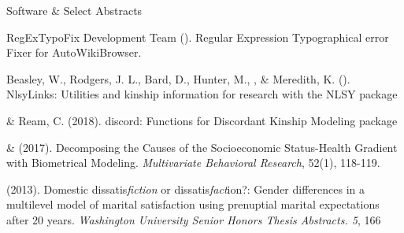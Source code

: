 \begin{rSection}{\textrm{Software \& Select Abstracts}}%
\begin{etaremune}
\item RegExTypoFix Development Team (\the\year). Regular Expression Typographical error Fixer for AutoWikiBrowser. \href{https://en.wikipedia.org/wiki/Wikipedia:AutoWikiBrowser/Typos}{\color{blue}{https://en.wikipedia.org/wiki/Wikipedia:AutoWikiBrowser/Typos}}
\item  Beasley, W., Rodgers, J. L., Bard, D., Hunter, M., \meb, \& Meredith, K. (\the\year). NlsyLinks: Utilities and kinship information for research with the NLSY \R package \href{https://cran.r-project.org/web/packages/NlsyLinks}{\color{blue}{https://cran.r-project.org/web/packages/NlsyLinks}}
\item\meb \& Ream, C. (2018). discord: Functions for Discordant Kinship Modeling \R package \href{https://CRAN.R-project.org/package=discord}{\color{blue}{https://CRAN.R-project.org/package=discord}}
\item\meb \& \joe (2017). Decomposing the Causes of the Socioeconomic Status-Health Gradient with Biometrical Modeling. \textit{Multivariate Behavioral Research}, 52(1), 118-119. \href{https://osf.io/xbkja/}{\color{blue}{https://osf.io/xbkja/}}

\item\meb (2013). Domestic dissatis{\em fiction} or dissatis{\em fact}ion?: Gender differences in a multilevel model of marital satisfaction using prenuptial marital expectations after 20 years. {\em Washington University Senior Honors Thesis Abstracts. 5}, 166
\end{etaremune}
\end{rSection}